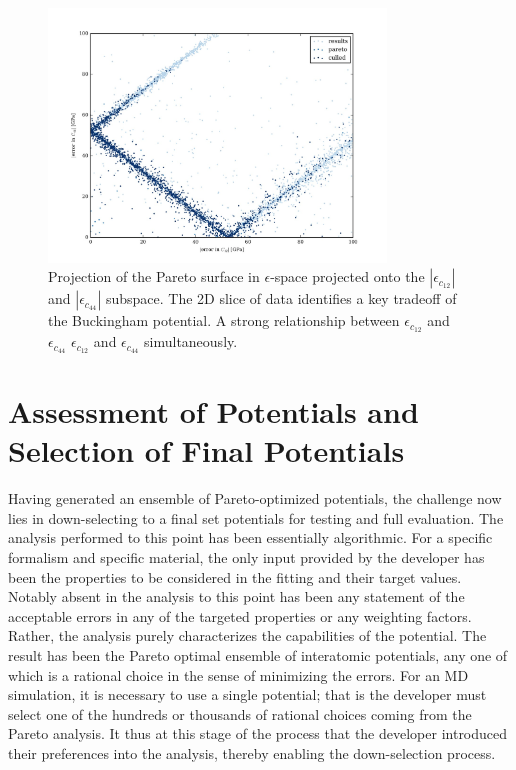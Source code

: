 \begin{figure}[ht]
	\centering
  \includegraphics[width=0.8\textwidth]{chapter7/MgO_bivariate_c11_v_c44}
  \caption{Projection of the Pareto surface  in $\epsilon$-space projected onto the $|\epsilon_{c_{12}}|$ and $|\epsilon_{c_{44}}|$ subspace.  The 2D slice of data identifies a key tradeoff of the Buckingham potential.  A strong relationship between $\epsilon_{c_{12}}$ and $\epsilon_{c_{44}}$ $\epsilon_{c_{12}}$ and $\epsilon_{c_{44}}$ simultaneously.}
  \label{fig:MgO_bivariate_c11_v_c44}
\end{figure}


\section{Assessment of Potentials and Selection of Final Potentials}

Having generated an ensemble of Pareto-optimized potentials, the challenge now lies in down-selecting to a final set potentials for testing and full evaluation. The analysis performed to this point has been essentially algorithmic. For a specific formalism and specific material, the only input provided by the developer has been the properties to be considered in the fitting and their target values. Notably absent in the analysis to this point has been any statement of the acceptable errors in any of the targeted properties or any weighting factors. Rather, the analysis purely characterizes the capabilities of the potential. The result has been the Pareto optimal ensemble of interatomic potentials, any one of which is a rational choice in the sense of minimizing the errors. For an MD simulation, it is necessary to use a single potential; that is the developer must select one of the hundreds or thousands of rational choices coming from the Pareto analysis.  It thus at this stage of the process that the developer introduced their preferences into the analysis, thereby enabling the down-selection process.

